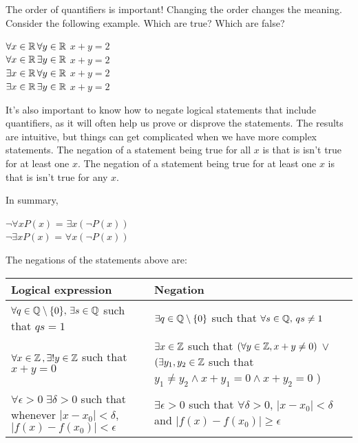 \documentclass{article}
\begin{document}
\vspace{1em}

The order of quantifiers is important! Changing the order changes the meaning. Consider the following example. Which are true? Which are false?

\begin{center}

$\forall x \in {\mathbb{R}} \, \forall y \in {\mathbb{R}}$  $x + y = 2$ \\
$\forall x \in {\mathbb{R}} \, \exists y \in {\mathbb{R}}$  $x + y = 2$ \\
$\exists x \in {\mathbb{R}} \, \forall y \in {\mathbb{R}}$  $x + y = 2$ \\
$\exists x \in {\mathbb{R}} \, \exists y \in {\mathbb{R}}$ $x + y = 2$ 
\end{center}
\vspace{1em}

It's also important to know how to negate logical statements that include quantifiers, as it will often help us prove or disprove the statements. The results are intuitive, but things can get complicated when we have more complex statements. The negation of a statement being true for all $x$ is that is isn't true for at least one $x$. The negation of a statement being true for at least one $x$ is that is isn't true for any $x$. 

In summary,

\begin{center}
    $\neg \forall x P(x)$ = $\exists  x (\neg P(x))$ \\
$\neg \exists x P(x)$ = $\forall x (\neg P(x))$
\end{center}

\vspace{1em}

The negations of the statements above are:
\vspace{1em}

\begin{tabular}{p{} p{}}
     Logical expression & Negation \\
     \hline
     $\forall q \in {\mathbb{Q}} \setminus \{0\}, \, \exists s \in {\mathbb{Q}}$ such that $qs=1$ & $\exists q \in {\mathbb{Q}} \setminus \{0\}$ such that  $\forall s \in {\mathbb{Q}}, \, qs \neq 1$\\
     $\forall x \in {\mathbb{Z}} \, , \exists ! y \in {\mathbb{Z}}$ such that $x+y = 0$ & $\exists x \in {\mathbb{Z}}$ such  that $(\forall y \in {\mathbb{Z}}, x+y \neq 0)$ $\vee$ $(\exists y_1, y_2 \in {\mathbb{Z}}$ such that $y_1 \neq y_2 \wedge x+y_1 = 0 \wedge x+y_2 = 0$  ) \\
     $\forall \epsilon >0 \; \exists \delta > 0$ such that whenever $|x - x_0| < \delta$, $|f(x)-f(x_0)| < \epsilon$ & $\exists \epsilon >0$ such that $\forall \delta > 0$,  $|x - x_0| < \delta$ and  $|f(x)-f(x_0)| \geq \epsilon$
\end{tabular}
\end{document}
